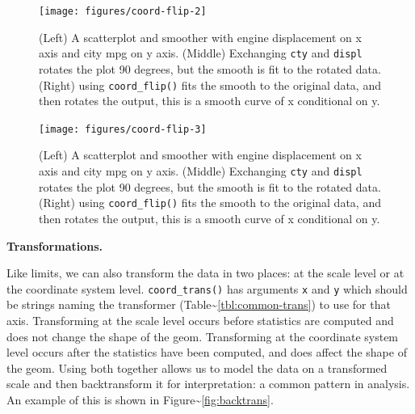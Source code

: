 \begin{figure}
\texttt{[image: figures/coord-flip-2]} \caption{(Left) A scatterplot and smoother with engine displacement on x axis and city mpg on y axis.  (Middle) Exchanging \texttt{cty} and \texttt{displ} rotates the plot 90 degrees, but the smooth is fit to the rotated data.  (Right) using \texttt{coord\_flip()} fits the smooth to the original data, and then rotates the output, this is a smooth curve of x conditional on y.\label{fig:coord-flip2}}
\end{figure}

\begin{Shaded}
\begin{Highlighting}[]
 \StringTok{ }\NormalTok{() +}\StringTok{ }\NormalTok{()}
\end{Highlighting}
\end{Shaded}

\begin{figure}
\texttt{[image: figures/coord-flip-3]} \caption{(Left) A scatterplot and smoother with engine displacement on x axis and city mpg on y axis.  (Middle) Exchanging \texttt{cty} and \texttt{displ} rotates the plot 90 degrees, but the smooth is fit to the rotated data.  (Right) using \texttt{coord\_flip()} fits the smooth to the original data, and then rotates the output, this is a smooth curve of x conditional on y.\label{fig:coord-flip3}}
\end{figure}

\textbf{Transformations.}

Like limits, we can also transform the data in two places: at the scale
level or at the coordinate system level. \texttt{coord\_trans()} has
arguments \texttt{x} and \texttt{y} which should be strings naming the
transformer (Table\textasciitilde{}\ref{tbl:common-trans}) to use for
that axis. Transforming at the scale level occurs before statistics are
computed and does not change the shape of the geom. Transforming at the
coordinate system level occurs after the statistics have been computed,
and does affect the shape of the geom. Using both together allows us to
model the data on a transformed scale and then backtransform it for
interpretation: a common pattern in analysis. An example of this is
shown in Figure\textasciitilde{}\ref{fig:backtrans}.
 

